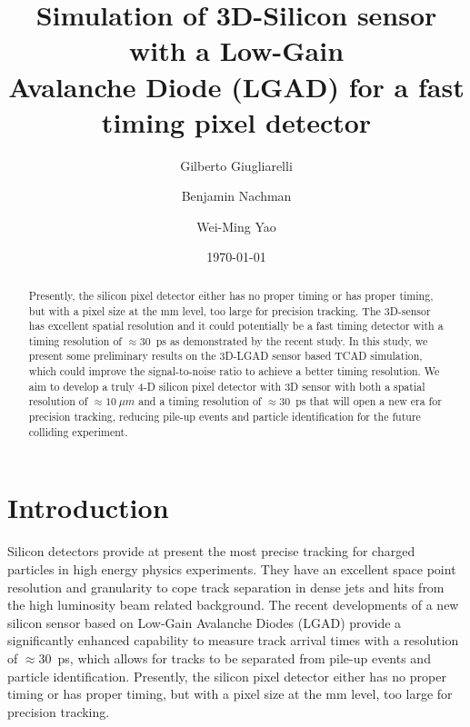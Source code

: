 \documentclass[aps,pt14,superscriptaddress,showpacs,floatfix,nofootinbib]{revtex4}
\begin{document}
\title{Simulation of 3D-Silicon sensor with a Low-Gain \\ Avalanche Diode (LGAD) for a fast timing pixel detector}

\author{Gilberto Giugliarelli}

\author{Benjamin Nachman}

\author{Wei-Ming Yao}

\begin{abstract}
Presently, the silicon
pixel detector either has no proper timing or has proper timing, but with a
pixel size at the mm level, too large for precision tracking.
The 3D-sensor has excellent spatial resolution and it could potentially be a fast timing detector with a timing
resolution of $\approx$30~ps as demonstrated by the recent study.
In this study, we present some preliminary results on the 3D-LGAD sensor based TCAD simulation, which
could improve the signal-to-noise ratio to achieve a better timing resolution.
We aim to develop a truly 4-D silicon pixel detector with 3D sensor with both a spatial
resolution of $\approx 10~\mu m$ and a timing resolution of $\approx$30~ps
that  will open a new era for precision tracking, reducing pile-up
events and particle identification for the future colliding experiment.
\end{abstract}

\date{\today}
\maketitle

\section{Introduction}

Silicon detectors provide at present the most precise tracking for charged
particles in high energy physics experiments. They have an excellent space
point resolution and granularity to cope track separation in dense jets and
hits from the high luminosity beam related background.
The recent developments of a new silicon sensor based on Low-Gain Avalanche
Diodes (LGAD) provide a significantly enhanced capability to measure
track arrival times with a resolution of $\approx$30~ps, which allows for tracks to be 
separated from pile-up events and particle identification. Presently, the silicon
pixel detector either has no proper timing or has proper timing, but with a  
pixel size at the mm level, too large for precision tracking.
\end{document}
